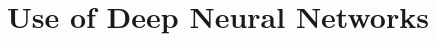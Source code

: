 \documentclass{report}
\begin{document}
	\chapter{Use of Deep Neural Networks}
	
	
	
	
	
\end{document}
